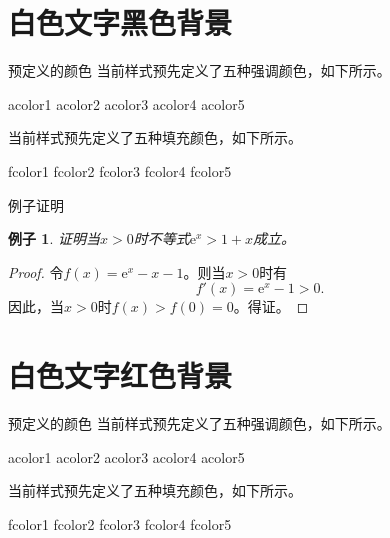 \documentclass[14pt,notheorems]{beamer}
\newtheorem{example}[theorem]{例子}
\begin{document}

\begin{frame}[plain]\transboxout
\titlepage
\end{frame}

\section{白色文字黑色背景}

\begin{frame}{预定义的颜色}
当前样式预先定义了五种强调颜色，如下所示。
\begin{flushleft}
\textcolor{acolor1}{acolor1}
\textcolor{acolor2}{acolor2}
\textcolor{acolor3}{acolor3}
\textcolor{acolor4}{acolor4}
\textcolor{acolor5}{acolor5}
\end{flushleft}
当前样式预先定义了五种填充颜色，如下所示。
\begin{flushleft}
\colorbox{fcolor1}{fcolor1}
\colorbox{fcolor2}{fcolor2}
\colorbox{fcolor3}{fcolor3}
\colorbox{fcolor4}{fcolor4}
\colorbox{fcolor5}{fcolor5}
\end{flushleft}
\end{frame}

\begin{frame}{例子证明}
\begin{example}
证明当$x>0$时不等式$\mathrm{e}^x>1+x$成立。
\end{example}\pause
\begin{proof}
令$f(x)=\mathrm{e}^x-x-1$。则当$x>0$时有
$$f'(x)=\mathrm{e}^x-1>0.$$
因此，当$x>0$时$f(x)>f(0)=0$。得证。
\end{proof}
\end{frame}


\begin{frame}[plain]\transboxout
\titlepage
\end{frame}

\section{白色文字红色背景}

\begin{frame}{预定义的颜色}
当前样式预先定义了五种强调颜色，如下所示。
\begin{flushleft}
\textcolor{acolor1}{acolor1}
\textcolor{acolor2}{acolor2}
\textcolor{acolor3}{acolor3}
\textcolor{acolor4}{acolor4}
\textcolor{acolor5}{acolor5}
\end{flushleft}
当前样式预先定义了五种填充颜色，如下所示。
\begin{flushleft}
\colorbox{fcolor1}{fcolor1}
\colorbox{fcolor2}{fcolor2}
\colorbox{fcolor3}{fcolor3}
\colorbox{fcolor4}{fcolor4}
\colorbox{fcolor5}{fcolor5}
\end{flushleft}
\end{frame}
\end{document}
